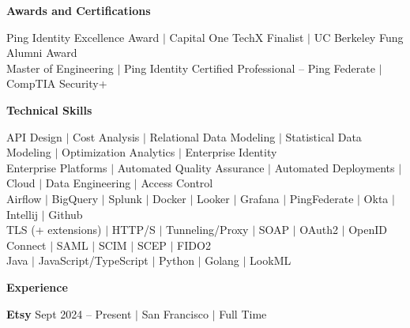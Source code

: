 \documentclass{article}
\begin{document}

\center\Large\textbf{Awards and Certifications}
\begin{minipage}{\textwidth}\center\normalsize
  \vspace{0.3cm}
  Ping Identity Excellence Award $|$ Capital One TechX Finalist $|$ UC Berkeley Fung Alumni Award \\
  \vspace{0.2cm}
  Master of Engineering $|$ Ping Identity Certified Professional -- Ping Federate $|$ CompTIA Security+
  \vspace{0.2cm}
\end{minipage}

\vspace{0.3cm}\center\Large\textbf{Technical Skills}

\begin{minipage}{\textwidth}\center\normalsize
  \vspace{0.3cm}
  API Design $|$ 
  Cost Analysis $|$
  Relational Data Modeling $|$
  Statistical Data Modeling $|$
  Optimization Analytics $|$
  Enterprise Identity \\
  \vspace{0.3cm}
  Enterprise Platforms $|$
  Automated Quality Assurance $|$
  Automated Deployments $|$
  Cloud $|$
  Data Engineering $|$
  Access Control\\
  \vspace{0.3cm}
  Airflow $|$
  BigQuery $|$
  Splunk $|$
  Docker $|$
  Looker $|$
  Grafana $|$
  PingFederate $|$
  Okta $|$
  Intellij $|$
  Github\\
  \vspace{0.3cm}
  TLS (+ extensions) $|$
  HTTP/S $|$
  Tunneling/Proxy $|$
  SOAP $|$
  OAuth2 $|$ 
  OpenID Connect $|$ 
  SAML $|$
  SCIM $|$
  SCEP $|$
  FIDO2\\
  \vspace{0.3cm}
  Java $|$
  JavaScript/TypeScript $|$
  Python $|$
  Golang $|$
  LookML\\
\end{minipage}

\vspace{0.5cm}\center\Large\textbf{Experience}
\vspace{0.2cm}\color{headercolor}

\flushleft\noindent\large\textbf{Etsy}\hfill\small{
  Sept 2024 -- Present $|$ San Francisco $|$ Full Time
}\color{black}
\end{document}
